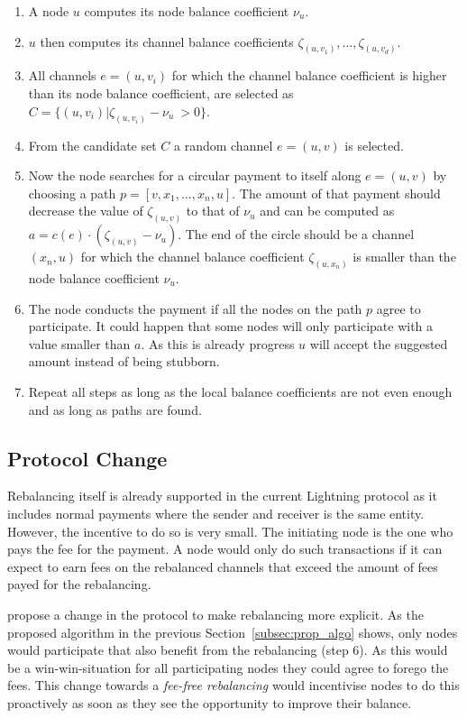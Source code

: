 \documentclass[final]{fhnwreport}       %
\begin{document}
\begin{enumerate}
\item A node $u$ computes its node balance coefficient $\nu_u$.
\item $u$ then computes its channel balance coefficients $\zeta_{(u,v_1)},\dots,\zeta_{(u,v_d)}$.
\item All channels $e=(u,v_i)$ for which the channel balance coefficient is higher 
than its node balance coefficient, are selected as $C = \{(u,v_i) | \zeta_{(u,v_i)} - \nu_u\ > 0\}$.
\item From the candidate set $C$ a random channel $e=(u,v)$ is selected.
\item Now the node searches for a circular payment to itself along $e=(u,v)$ by choosing a path $p = [v,x_1,\dots,x_n,u]$. The amount of that payment should decrease the value of $\zeta_{(u,v)}$ to that of $\nu_u$ and can be computed as $a = c(e)\cdot (\zeta_{(u,v)}-\nu_u)$. The end of the circle should be a channel $(x_n,u)$ for which the channel balance coefficient $\zeta_{(u,x_n)}$ is smaller than the node balance coefficient $\nu_u$.
\item The node conducts the payment if all the nodes on the path $p$ agree to participate. It could happen that some nodes will only participate with a value smaller than $a$. As this is already progress $u$ will accept the suggested amount instead of being stubborn. 
\item Repeat all steps as long as the local balance coefficients are not even enough and as long as paths are found.
\end{enumerate}

\subsection{Protocol Change}
Rebalancing itself is already supported in the current Lightning protocol as it includes normal payments where the sender and receiver is the same entity. However, the incentive to do so is very small. The initiating node is the one who pays the fee for the payment. A node would only do such transactions if it can expect to earn fees on the rebalanced channels that exceed the amount of fees payed for the rebalancing. 

\textcite{pickhardt_imbalance_2019} propose a change in the protocol to make rebalancing more explicit. As the proposed algorithm in the previous Section~\ref{subsec:prop_algo} shows, only nodes would participate that also benefit from the rebalancing (step 6). As this would be a win-win-situation for all participating nodes they could agree to forego the fees. This change towards a \emph{fee-free rebalancing} would incentivise nodes to do this proactively as soon as they see the opportunity to improve their balance.
\end{document}
